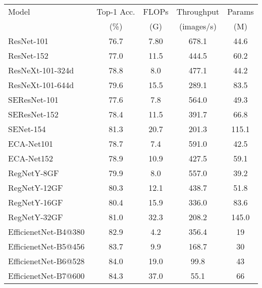 \documentclass[10pt,twocolumn,letterpaper]{article}
\begin{document}
\begin{table}[t]
    \centering
    \begin{adjustbox}{max width=\linewidth}
    \begin{tabular}{l|c|c|c|c}
        \toprule
             Model   & Top-1 Acc. & FLOPs & Throughput & Params \\ 
                     & (\%) &  (G) & (images/s) & (M) \\
        \midrule
        
ResNet-101~\cite{ResNet_He_2016_CVPR} & 76.7 & 7.80 & 678.1 & 44.6 \\
ResNet-152~\cite{ResNet_He_2016_CVPR} & 77.0 & 11.5 & 444.5 & 60.2 \\
\midrule
ResNeXt-101-324d~\cite{ResNeXt_Xie_2017_CVPR} & 78.8 & 8.0 & 477.1 & 44.2 \\
ResNeXt-101-644d~\cite{ResNeXt_Xie_2017_CVPR} & 79.6 & 15.5 & 289.1 & 83.5 \\
\midrule
SEResNet-101~\cite{SENet_Hu_2018} & 77.6 & 7.8 & 564.0 & 49.3 \\
SEResNet-152~\cite{SENet_Hu_2018} & 78.4 & 11.5 & 391.7 & 66.8 \\
SENet-154~\cite{SENet_Hu_2018} & 81.3 & 20.7 & 201.3 & 115.1\\
\midrule
ECA-Net101~\cite{ECA_wang2020} & 78.7 & 7.4 & 591.0 & 42.5 \\
ECA-Net152~\cite{ECA_wang2020} & 78.9 & 10.9 & 427.5 & 59.1 \\
\midrule
RegNetY-8GF~\cite{RegNet_Radosavovic_2020_CVPR} & 79.9 & 8.0 & 557.0 & 39.2 \\ RegNetY-12GF~\cite{RegNet_Radosavovic_2020_CVPR} & 80.3 & 12.1 & 438.7 & 51.8 \\ RegNetY-16GF~\cite{RegNet_Radosavovic_2020_CVPR} & 80.4 & 15.9 & 336.0 & 83.6 \\
RegNetY-32GF~\cite{RegNet_Radosavovic_2020_CVPR} & 81.0 & 32.3 & 208.2 & 145.0  \\

\midrule
EfficienetNet-B4@380~\cite{efficientnet_pmlr_tan_19}& 82.9& 4.2 & 356.4 & 19 \\
EfficienetNet-B5@456~\cite{efficientnet_pmlr_tan_19}& 83.7& 9.9 & 168.7 & 30 \\
EfficienetNet-B6@528~\cite{efficientnet_pmlr_tan_19}& 84.0& 19.0 & 99.8 & 43 \\
EfficienetNet-B7@600~\cite{efficientnet_pmlr_tan_19}& 84.3& 37.0 & 55.1 & 66 \\



\end{tabular}
\end{adjustbox}
\end{table}
\end{document}
